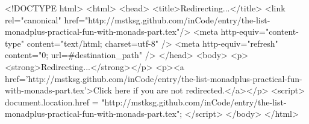 <!DOCTYPE html>
<html>
<head>
<title>Redirecting...</title>
<link rel="canonical" href="http://mstksg.github.com/inCode/entry/the-list-monadplus-practical-fun-with-monads-part.tex"/>
<meta http-equiv="content-type" content="text/html; charset=utf-8" />
<meta http-equiv="refresh" content="0; url=#{destination_path}" />
</head>
<body>
  <p><strong>Redirecting...</strong></p>
  <p><a href='http://mstksg.github.com/inCode/entry/the-list-monadplus-practical-fun-with-monads-part.tex'>Click here if you are not redirected.</a></p>
  <script>
    document.location.href = "http://mstksg.github.com/inCode/entry/the-list-monadplus-practical-fun-with-monads-part.tex";
  </script>
</body>
</html>
